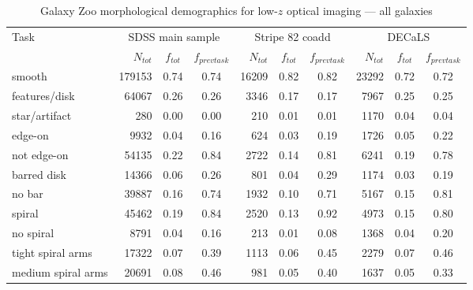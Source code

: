 \documentclass[iop,apj,tighten]{emulateapj}
\begin{document}
\begin{table*}
\centering
\caption{Galaxy Zoo morphological demographics for low-$z$ optical imaging --- all galaxies}\label{tbl-allgals}
\begin{tabular}{l|rcc|rcc|rcc}
\hline\hline
    Task & \multicolumn{3}{c}{SDSS main sample} & \multicolumn{3}{c}{Stripe 82 coadd} & \multicolumn{3}{c}{DECaLS} \\
    
    & $N_{tot}$ & $f_{tot}$ & $f_{prev task}$ & $N_{tot}$ & $f_{tot}$ & $f_{prev task}$ & $N_{tot}$ & $f_{tot}$ & $f_{prev task}$ \\
    \hline
    
    smooth                  & 179153 & 0.74    & 0.74    &  16209 & 0.82    & 0.82    & 23292 & 0.72    & 0.72 \\
    features/disk           &  64067 & 0.26    & 0.26    &   3346 & 0.17    & 0.17    &  7967 & 0.25    & 0.25 \\
    star/artifact           &    280 & 0.00    & 0.00    &    210 & 0.01    & 0.01    &  1170 & 0.04    & 0.04 \\
    \hline                                                                    
    edge-on                 &   9932 & 0.04    & 0.16    &    624 & 0.03    & 0.19    &  1726 & 0.05    & 0.22 \\
    not edge-on             &  54135 & 0.22    & 0.84    &   2722 & 0.14    & 0.81    &  6241 & 0.19    & 0.78 \\
    \hline                                                                              
    barred disk             &  14366 & 0.06    & 0.26    &    801 & 0.04    & 0.29    &  1174 & 0.03    & 0.19 \\
    no bar                  &  39887 & 0.16    & 0.74    &   1932 & 0.10    & 0.71    &  5167 & 0.15    & 0.81 \\
    \hline                                                                              
    spiral                  &  45462 & 0.19    & 0.84    &   2520 & 0.13    & 0.92    &  4973 & 0.15    & 0.80 \\
    no spiral               &   8791 & 0.04    & 0.16    &    213 & 0.01    & 0.08    &  1368 & 0.04    & 0.20 \\
    \hline                                                                            
    tight spiral arms       &  17322 & 0.07    & 0.39    &   1113 & 0.06    & 0.45    &  2279 & 0.07    & 0.46 \\
    medium spiral arms      &  20691 & 0.08    & 0.46    &    981 & 0.05    & 0.40    &  1637 & 0.05    & 0.33 \\

\end{tabular}
\end{table*}
\end{document}
